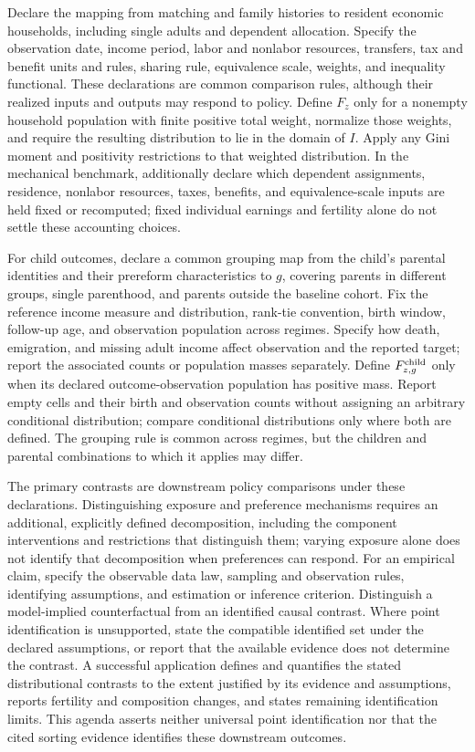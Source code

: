 \documentclass[11pt,a4paper]{article}
\begin{document}
Declare the mapping from matching and family histories to resident economic households, including single adults and dependent allocation. Specify the observation date, income period, labor and nonlabor resources, transfers, tax and benefit units and rules, sharing rule, equivalence scale, weights, and inequality functional. These declarations are common comparison rules, although their realized inputs and outputs may respond to policy. Define \(F_z\) only for a nonempty household population with finite positive total weight, normalize those weights, and require the resulting distribution to lie in the domain of \(I\). Apply any Gini moment and positivity restrictions to that weighted distribution. In the mechanical benchmark, additionally declare which dependent assignments, residence, nonlabor resources, taxes, benefits, and equivalence-scale inputs are held fixed or recomputed; fixed individual earnings and fertility alone do not settle these accounting choices.

For child outcomes, declare a common grouping map from the child's parental identities and their prereform characteristics to \(g\), covering parents in different groups, single parenthood, and parents outside the baseline cohort. Fix the reference income measure and distribution, rank-tie convention, birth window, follow-up age, and observation population across regimes. Specify how death, emigration, and missing adult income affect observation and the reported target; report the associated counts or population masses separately. Define \(F^{\rm child}_{z,g}\) only when its declared outcome-observation population has positive mass. Report empty cells and their birth and observation counts without assigning an arbitrary conditional distribution; compare conditional distributions only where both are defined. The grouping rule is common across regimes, but the children and parental combinations to which it applies may differ.

The primary contrasts are downstream policy comparisons under these declarations. Distinguishing exposure and preference mechanisms requires an additional, explicitly defined decomposition, including the component interventions and restrictions that distinguish them; varying exposure alone does not identify that decomposition when preferences can respond. For an empirical claim, specify the observable data law, sampling and observation rules, identifying assumptions, and estimation or inference criterion. Distinguish a model-implied counterfactual from an identified causal contrast. Where point identification is unsupported, state the compatible identified set under the declared assumptions, or report that the available evidence does not determine the contrast. A successful application defines and quantifies the stated distributional contrasts to the extent justified by its evidence and assumptions, reports fertility and composition changes, and states remaining identification limits. This agenda asserts neither universal point identification nor that the cited sorting evidence identifies these downstream outcomes.
\end{document}
